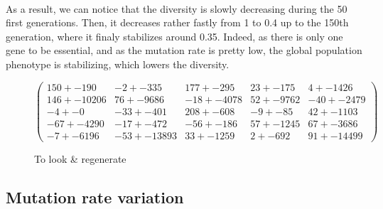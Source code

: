 \documentclass[]{report} %
\begin{document}
    \paragraph*{}
    As a result, we can notice that the diversity is slowly decreasing during the 50 first generations. Then, it decreases rather fastly from 1 to 0.4 up to the 150th generation, where it finaly stabilizes around 0.35. Indeed, as there is only one gene to be essential, and as the mutation rate is pretty low, the global population phenotype is stabilizing, which lowers the diversity.

    \begin{figure}[H] 
            \centering
            \small
    $
            \begin{pmatrix}
                150 +- 190 & -2 +- 335 & 177 +- 295 & 23 +- 175 & 4 +- 1426 \\
                146 +- 10206 & 76 +- 9686 & -18 +- 4078 & 52 +- 9762 & -40 +- 2479 \\
                -4 +- 0 & -33 +- 401 & 208 +- 608 & -9 +- 85 & 42 +- 1103 \\
                -67 +- 4290 & -17 +- 472 & -56 +- 186 & 57 +- 1245 & 67 +- 3686 \\
                -7 +- 6196 & -53 +- 13893 & 33 +- 1259 & 2 +- 692 & 91 +- 1449 9 
            \end{pmatrix}
    $
            \caption{\footnotesize To look \& regenerate}
            \label{mat:ps300xg200xmr1-10-4}
    \end{figure}
    
    
    
    \subsection{Mutation rate variation}
    \paragraph*{}
    
\end{document}
